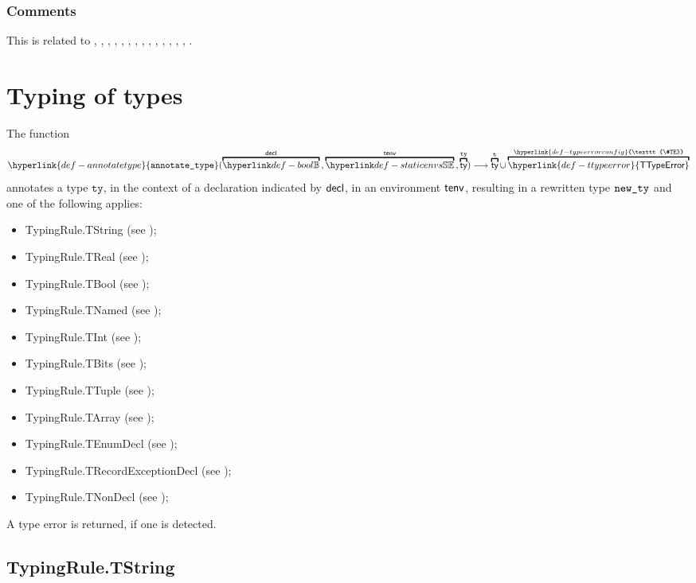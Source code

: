 \documentclass{book}
\newcommand\TTypeError[0]{\hyperlink{def-ttypeerror}{\textsf{TTypeError}}}
\newcommand\TypeErrorConfig[0]{\hyperlink{def-typeerrorconfig}{\texttt{\#TE}}}
\newcommand\annotatetype[1]{\hyperlink{def-annotatetype}{\texttt{annotate\_type}}(#1)}
\newcommand\vt[0]{\texttt{t}}
\newcommand\tty[0]{\texttt{ty}}
\begin{document}
\subsection{Comments}
  This is related to , , ,
  , , , , ,
  , , , , ,
  , .

\chapter{Typing of types}
\hypertarget{def-annotatetype}{}
The function
\[
  \annotatetype{\overname{\Bool}{\decl} \aslsep \overname{\staticenvs}{\tenv} \aslsep \overname{\ty}{\tty}}
  \aslto \overname{\ty}{\vt} \cup \overname{\TTypeError}{\TypeErrorConfig}
\]
annotates a type $\tty$, in the context of a declaration indicated by $\textsf{decl}$,
in an environment $\textsf{tenv}$, resulting in a
rewritten type $\texttt{new\_ty}$ and one of the following applies:
\begin{itemize}
  \item TypingRule.TString (see );
  \item TypingRule.TReal (see );
  \item TypingRule.TBool (see );
  \item TypingRule.TNamed (see );
  \item TypingRule.TInt (see );
  \item TypingRule.TBits (see );
  \item TypingRule.TTuple (see );
  \item TypingRule.TArray (see );
  \item TypingRule.TEnumDecl (see );
  \item TypingRule.TRecordExceptionDecl (see
    );
  \item TypingRule.TNonDecl (see );
\end{itemize}
A type error is returned, if one is detected.

\section{TypingRule.TString \label{sec:TypingRule.TString}}
\end{document}
